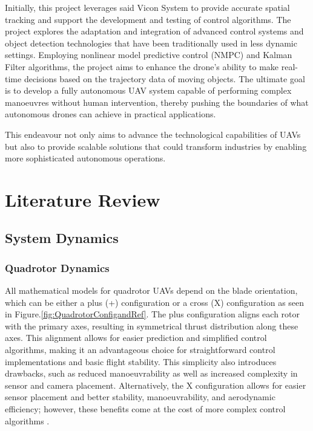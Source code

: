 \documentclass{UoNMCHA}
\numberwithin{equation}{section}
\begin{document}
Initially, this project leverages said Vicon System to provide accurate spatial tracking and support the development and testing of control algorithms. The project explores the adaptation and integration of advanced control systems and object detection technologies that have been traditionally used in less dynamic settings. Employing nonlinear model predictive control (NMPC) and Kalman Filter algorithms, the project aims to enhance the drone's ability to make real-time decisions based on the trajectory data of moving objects. The ultimate goal is to develop a fully autonomous UAV system capable of performing complex manoeuvres without human intervention, thereby pushing the boundaries of what autonomous drones can achieve in practical applications. 

This endeavour not only aims to advance the technological capabilities of UAVs but also to provide scalable solutions that could transform industries by enabling more sophisticated autonomous operations.



\section{Literature Review}


\subsection{System Dynamics}

\subsubsection{Quadrotor Dynamics}
All mathematical models for quadrotor UAVs depend on the blade orientation, which can be either a plus (+) configuration or a cross (X) configuration as seen in Figure.\ref{fig:QuadrotorConfigandRef}. The plus configuration aligns each rotor with the primary axes, resulting in symmetrical thrust distribution along these axes. This alignment allows for easier prediction and simplified control algorithms, making it an advantageous choice for straightforward control implementations and basic flight stability. This simplicity also introduces drawbacks, such as reduced manoeuvrability as well as increased complexity in sensor and camera placement. Alternatively, the X configuration allows for easier sensor placement and better stability, manoeuvrability, and aerodynamic efficiency; however, these benefits come at the cost of more complex control algorithms \cite{article:CrossVsPlus}.  
\end{document}
